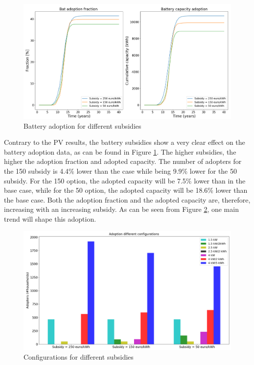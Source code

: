 \begin{figure}[h!]
\centering
\includegraphics[width=12cm]{ModelAnalysis/Batsubs.png}
\caption{Battery adoption for different subsidies}
\label{Figure:batsubsvol}
\end{figure}
 \noindent
Contrary to the PV results, the battery subsidies show a very clear effect on the battery adoption data, as can be found in Figure \ref{Figure:batsubsvol}. The higher subsidies, the higher the adoption fraction and adopted capacity. The number of adopters for the \EUR{} 150 subsidy is 4.4\% lower than the case while being 9.9\% lower for the \EUR{} 50 subsidy. For the 150 \EUR{} option, the adopted capacity will be 7.5\% lower than in the base case, while for the 50 \EUR{} option, the adopted capacity will be 18.6\% lower than the base case. Both the adoption fraction and the adopted capacity are, therefore, increasing with an increasing subsidy. As can be seen from Figure \ref{Figure:configsubsvol}, one main trend will shape this adoption. 
\begin{figure}[h!]
\centering
\includegraphics[width=12cm]{ModelAnalysis/Configsubs.png}
\caption{Configurations for different subsidies}
\label{Figure:configsubsvol}
\end{figure}
 \noindent
